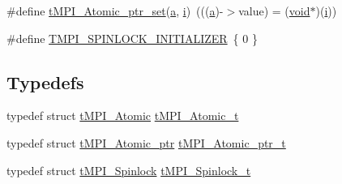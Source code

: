 \begin{DoxyCompactItemize}
\#define \hyperlink{share_2template_2gromacs_2thread__mpi_2atomic_2suncc-sparc_8h_a8b8855344b6d33a7f1e2793056fbf418}{t\-M\-P\-I\-\_\-\-Atomic\-\_\-ptr\-\_\-set}(\hyperlink{share_2template_2gromacs_2gmx__lapack_8h_a0880879736d1ab747a972d1942421886}{a}, \hyperlink{share_2template_2gromacs_2gmx__lapack_8h_a3c7542401c1cb8bd37ef5e7d9eb0f5a8}{i})~(((\hyperlink{share_2template_2gromacs_2gmx__lapack_8h_a0880879736d1ab747a972d1942421886}{a})-\/$>$value) = (\hyperlink{nbnxn__kernel__simd__4xn__outer_8h_a8dc3f4a797ed992dff49d2fa3477eee8}{void}$\ast$)(\hyperlink{share_2template_2gromacs_2gmx__lapack_8h_a3c7542401c1cb8bd37ef5e7d9eb0f5a8}{i}))
\item 
\#define \hyperlink{share_2template_2gromacs_2thread__mpi_2atomic_2suncc-sparc_8h_a1e5bbd6483e8792893f3a5e8e2bbe510}{\-T\-M\-P\-I\-\_\-\-S\-P\-I\-N\-L\-O\-C\-K\-\_\-\-I\-N\-I\-T\-I\-A\-L\-I\-Z\-E\-R}~\{ 0 \}
\end{DoxyCompactItemize}
\subsection*{\-Typedefs}
\begin{DoxyCompactItemize}
\item 
typedef struct \hyperlink{structtMPI__Atomic}{t\-M\-P\-I\-\_\-\-Atomic} \hyperlink{share_2template_2gromacs_2thread__mpi_2atomic_2suncc-sparc_8h_a2c33794dc540e3b07cffc1f81a3fe4b4}{t\-M\-P\-I\-\_\-\-Atomic\-\_\-t}
\item 
typedef struct \hyperlink{structtMPI__Atomic__ptr}{t\-M\-P\-I\-\_\-\-Atomic\-\_\-ptr} \hyperlink{share_2template_2gromacs_2thread__mpi_2atomic_2suncc-sparc_8h_a4c91c0105f1c0a5f23bc4239274291eb}{t\-M\-P\-I\-\_\-\-Atomic\-\_\-ptr\-\_\-t}
\item 
typedef struct \hyperlink{structtMPI__Spinlock}{t\-M\-P\-I\-\_\-\-Spinlock} \hyperlink{share_2template_2gromacs_2thread__mpi_2atomic_2suncc-sparc_8h_a633ceb65ba18cbc39b03d5f44bf66875}{t\-M\-P\-I\-\_\-\-Spinlock\-\_\-t}
\end{DoxyCompactItemize}
